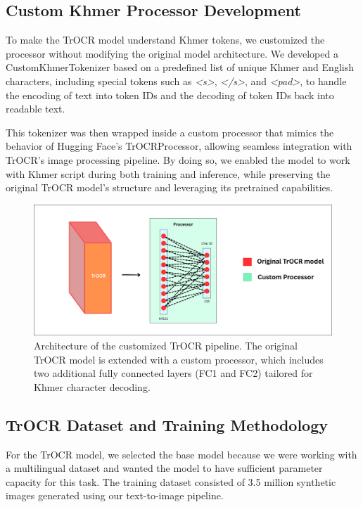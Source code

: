 \subsection{Custom Khmer Processor Development}
\label{subsec:trocr-customization}

To make the TrOCR model understand Khmer tokens, we customized the processor without modifying the original model architecture. We developed a CustomKhmerTokenizer based on a predefined list of unique Khmer and English characters, including special tokens such as \textit{<s>}, \textit{</s>}, and \textit{<pad>}, to handle the encoding of text into token IDs and the decoding of token IDs back into readable text.

This tokenizer was then wrapped inside a custom processor that mimics the behavior of Hugging Face's TrOCRProcessor, allowing seamless integration with TrOCR's image processing pipeline. By doing so, we enabled the model to work with Khmer script during both training and inference, while preserving the original TrOCR model's structure and leveraging its pretrained capabilities.

\begin{figure}[H]
    \centering
    \includegraphics[width=\textwidth]{figures/Customize_processor.png}
    \caption{Architecture of the customized TrOCR pipeline. 
    The original TrOCR model is extended with a custom processor, 
    which includes two additional fully connected layers 
    (FC1 and FC2) tailored for Khmer character decoding.}
    \label{fig:trocr-custom-processor}
\end{figure}

\subsection{TrOCR Dataset and Training Methodology}
\label{subsec:trocr-training}

For the TrOCR model, we selected the base model because we were working with a multilingual dataset and wanted the model to have sufficient parameter capacity for this task. The training dataset consisted of 3.5 million synthetic images generated using our text-to-image pipeline.

